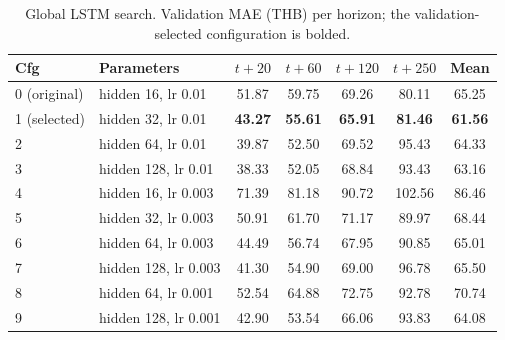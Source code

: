 \documentclass[11pt]{article}
\begin{document}
\begin{table}[htbp]\centering
\caption{Global LSTM search. Validation MAE (THB) per horizon; the validation-selected configuration is bolded.}
\label{tab:lstm}
\scriptsize
\setlength{\tabcolsep}{3.5pt}
\begin{tabular}{llccccc}
\toprule
Cfg & Parameters & $t{+}20$ & $t{+}60$ & $t{+}120$ & $t{+}250$ & Mean \\
\midrule
0 (original) & hidden 16, lr 0.01 & 51.87 & 59.75 & 69.26 & 80.11 & 65.25 \\
1 (selected) & hidden 32, lr 0.01 & \textbf{43.27} & \textbf{55.61} & \textbf{65.91} & \textbf{81.46} & \textbf{61.56} \\
2 & hidden 64, lr 0.01 & 39.87 & 52.50 & 69.52 & 95.43 & 64.33 \\
3 & hidden 128, lr 0.01 & 38.33 & 52.05 & 68.84 & 93.43 & 63.16 \\
4 & hidden 16, lr 0.003 & 71.39 & 81.18 & 90.72 & 102.56 & 86.46 \\
5 & hidden 32, lr 0.003 & 50.91 & 61.70 & 71.17 & 89.97 & 68.44 \\
6 & hidden 64, lr 0.003 & 44.49 & 56.74 & 67.95 & 90.85 & 65.01 \\
7 & hidden 128, lr 0.003 & 41.30 & 54.90 & 69.00 & 96.78 & 65.50 \\
8 & hidden 64, lr 0.001 & 52.54 & 64.88 & 72.75 & 92.78 & 70.74 \\
9 & hidden 128, lr 0.001 & 42.90 & 53.54 & 66.06 & 93.83 & 64.08 \\
\bottomrule
\end{tabular}
\end{table}
\end{document}

